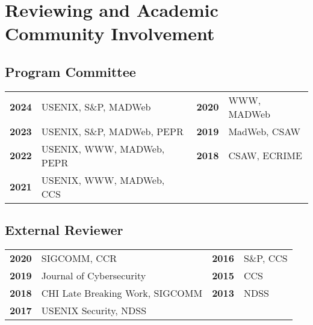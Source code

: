 \documentclass[wideaddress]{vitae}
\begin{document}
  
    \nocite{chouaki2023search}
    \nocite{mcquistin2023psl}
    \nocite{snyder2023poolparty}
    \nocite{randall2022uid}
    \nocite{davidson2022star}
    \nocite{smith2022blocked}
    \nocite{jueckstock2022stateful}
    \nocite{smith2021sugarcoat}
    \nocite{jueckstock2021measurements}
    \nocite{chen2021javascriptsigs}
    \nocite{snyder2020filters}
    \nocite{sjosten2020generation}
    \nocite{papadopoulos2020paywalls}
    \nocite{iqbal2020adgraph}
    \nocite{ghasemisharif2019speedreader}
    \nocite{snyder2017browser}
    \nocite{snyder2017doxing}
    \nocite{snyder2017cdf}
    \nocite{snyder2016browser}
    \nocite{snyder2016characterizing}
    \nocite{snyder2016phishing}
    \nocite{snyder2015no}
    \nocite{clark2015saw}
    \nocite{snyder2014yao}
    \nocite{snyder2014cloudsweeper}
    \nocite{snyder2013cloudsweeper}
  

  \section{Reviewing and Academic Community Involvement}
  \subsection{Program Committee}
  \begin{tabular}{p{}p{}p{}p{}}
    \textbf{2024} & USENIX, S\&P, MADWeb &           \textbf{2020} & WWW, MADWeb \\
    \textbf{2023} & USENIX, S\&P, MADWeb, PEPR &   \textbf{2019} & MadWeb, CSAW \\
    \textbf{2022} & USENIX, WWW, MADWeb, PEPR & \textbf{2018} & CSAW, ECRIME \\
    \textbf{2021} & USENIX, WWW, MADWeb, CCS \\
  \end{tabular}

  \subsection{External Reviewer}
  \begin{tabular}{p{}p{}p{}p{}}
    \textbf{2020} & SIGCOMM, CCR &                    \textbf{2016} & S\&P, CCS \\
    \textbf{2019} & Journal of Cybersecurity &        \textbf{2015} & CCS \\
    \textbf{2018} & CHI Late Breaking Work, SIGCOMM & \textbf{2013} & NDSS \\
    \textbf{2017} & USENIX Security, NDSS \\
  \end{tabular}
\end{document}
